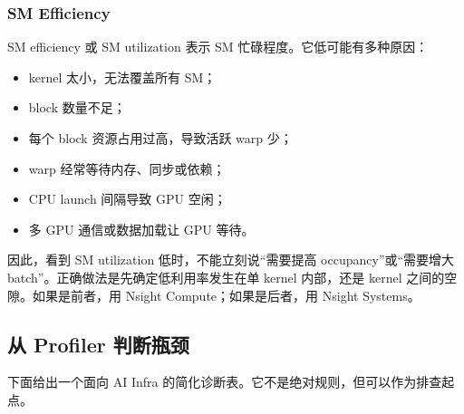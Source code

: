 \subsubsection{SM Efficiency}

SM efficiency 或 SM utilization 表示 SM 忙碌程度。它低可能有多种原因：

\begin{itemize}
  \item kernel 太小，无法覆盖所有 SM；
  \item block 数量不足；
  \item 每个 block 资源占用过高，导致活跃 warp 少；
  \item warp 经常等待内存、同步或依赖；
  \item CPU launch 间隔导致 GPU 空闲；
  \item 多 GPU 通信或数据加载让 GPU 等待。
\end{itemize}

因此，看到 SM utilization 低时，不能立刻说“需要提高 occupancy”或“需要增大 batch”。正确做法是先确定低利用率发生在单 kernel 内部，还是 kernel 之间的空隙。如果是前者，用 Nsight Compute；如果是后者，用 Nsight Systems。

\subsection{从 Profiler 判断瓶颈}
\label{subsec:diagnose-bottleneck}

下面给出一个面向 AI Infra 的简化诊断表。它不是绝对规则，但可以作为排查起点。

